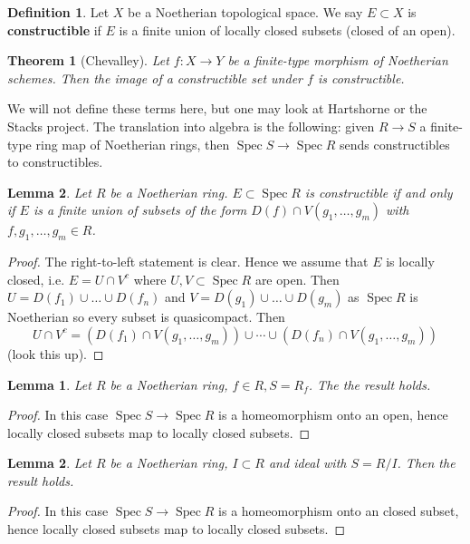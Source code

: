 \documentclass{article}
\DeclareMathOperator{\Spec}{Spec}
\theoremstyle{plain}
\newtheorem{thm}{Theorem}
\newtheorem{lem}[thm]{Lemma}
\newtheorem*{lem*}{Lemma}
\theoremstyle{definition}
\newtheorem{defn}{Definition}
\theoremstyle{remark}
\begin{document}
\begin{defn}
Let $X$ be a Noetherian topological space. We say $E\subset X$ is \textbf{constructible} if $E$ is a finite union of locally closed subsets (closed of an open).
\end{defn}

\begin{thm}[Chevalley]
Let $f:X\to Y$ be a finite-type morphism of Noetherian schemes. Then the image of a constructible set under $f$ is constructible.
\end{thm}
We will not define these terms here, but one may look at Hartshorne or the Stacks project. The translation into algebra is the following: given $R\to S$ a finite-type ring map of Noetherian rings, then $\Spec S\to\Spec R$ sends constructibles to constructibles.

\begin{lem}
Let $R$ be a Noetherian ring. $E\subset\Spec R$ is constructible if and only if $E$ is a finite union of subsets of the form $D(f)\cap V(g_1,\ldots, g_m)$ with $f,g_1,\ldots,g_m\in R$.
\end{lem}

\begin{proof}
The right-to-left statement is clear. Hence we assume that $E$ is locally closed, i.e. $E=U\cap V^c$ where $U,V\subset\Spec R$ are open. Then $U=D(f_1)\cup\ldots\cup D(f_n)$ and $V=D(g_1)\cup\ldots\cup D(g_m)$ as $\Spec R$ is Noetherian so every subset is quasicompact. Then
\[U\cap V^c=(D(f_1)\cap V(g_1,\ldots,g_m))\cup\cdots\cup (D(f_n)\cap V(g_1,\ldots,g_m))\]
(look this up).
\end{proof}

\begin{lem*}
Let $R$ be a Noetherian ring, $f\in R, S=R_f$. The the result holds.
\end{lem*}
\begin{proof}
In this case $\Spec S\to\Spec R$ is a homeomorphism onto an open, hence locally closed subsets map to locally closed subsets.
\end{proof}

\begin{lem*}
Let $R$ be a Noetherian ring, $I\subset R$ and ideal with $S=R/I$. Then the result holds.
\end{lem*}
\begin{proof}
In this case $\Spec S\to\Spec R$ is a homeomorphism onto an closed subset, hence locally closed subsets map to locally closed subsets.
\end{proof}
\end{document}

